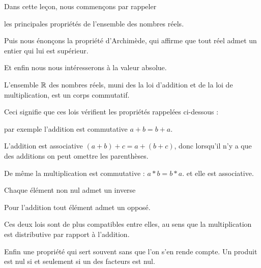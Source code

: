 







\debuttexte


\diapo

\change

Dans cette leçon, nous commençons par rappeler 

\change

les principales propriétés de l'ensemble des nombres réels.

\change

\change

Puis nous énonçons la propriété d'Archimède, qui affirme que tout réel admet un entier qui lui est supérieur.

\change

Et enfin nous nous intéresserons à la valeur absolue.


\diapo

L'ensemble $\mathbb{R}$ des nombres réels, muni des la loi d'addition et de la loi de multiplication, 
est un corps commutatif.

\change

Ceci signifie que ces lois vérifient les propriétés rappelées ci-dessous : 

par exemple l'addition est commutative $a+b=b+a$.

L'addition est associative $(a+b)+c=a+(b+c)$, donc lorsqu'il n'y a que des additions on peut omettre les parenthèses.

De même la multiplication est commutative : $a*b=b*a$.
et elle est associative.


Chaque élément non nul admet un inverse 

Pour l'addition tout élément admet un opposé.

\change

Ces deux lois sont de plus compatibles entre elles, 
au sens que la multiplication est distributive par rapport à l'addition.

Enfin une propriété qui sert souvent sans que l'on s'en rende compte.
Un produit est nul si et seulement si un des facteurs est nul.

\diapo

